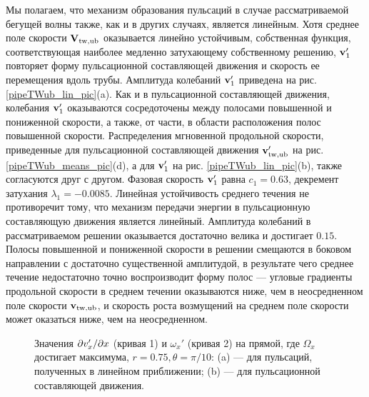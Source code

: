 Мы полагаем, что механизм образования пульсаций в случае рассматриваемой бегущей волны также, как и в других случаях, является линейным. Хотя среднее поле скорости $\mathbf{V}_\mathrm{tw,ub}$ оказывается линейно устойчивым, собственная функция, соответствующая наиболее медленно затухающему собственному решению, $\mathbf{v}'_1$ повторяет форму пульсационной составляющей движения и скорость ее перемещения вдоль трубы. Амплитуда колебаний $\mathbf{v}'_1$ приведена на рис. \ref{pipeTWub_lin_pic}(a). Как и в пульсационной составляющей движения, колебания $\mathbf{v}'_1$ оказываются сосредоточены между полосами повышенной и пониженной скорости, а также, от части, в области расположения полос повышенной скорости. Распределения мгновенной продольной скорости, приведенные для пульсационной составляющей движения $\mathbf{v}'_\mathrm{tw,ub}$ на рис. \ref{pipeTWub_means_pic}(d), а для $\mathbf{v}'_1$ на рис. \ref{pipeTWub_lin_pic}(b), также согласуются друг с другом. Фазовая скорость $\mathbf{v}'_1$ равна $c_1 = 0.63$, декремент затухания $\lambda_1 = -0.0085$. Линейная устойчивость среднего течения не противоречит тому, что механизм передачи энергии в пульсационную составляющую движения является линейный. Амплитуда колебаний в рассматриваемом решении оказывается достаточно велика и достигает $0.15$. Полосы повышенной и пониженной скорости в решении смещаются в боковом направлении с достаточно существенной амплитудой, в результате чего среднее течение недостаточно точно воспроизводит форму полос --- угловые градиенты продольной скорости в среднем течении оказываются ниже, чем в неосредненном поле скорости $\mathbf{v}_\mathrm{tw,ub}$, и скорость роста возмущений на среднем поле скорости может оказаться ниже, чем на неосредненном.

\begin{figure}
\caption{Значения $\partial v_x' /\partial x$ (кривая 1) и $\omega_x'$ (кривая 2) на прямой, где $\Omega_x$ достигает максимума, $r = 0.75, \theta = \pi/10$: (a) --- для пульсаций, полученных в линейном приближении; (b) --- для пульсационной составляющей движения. }
\label{pipeTWub_corr_pic}
\end{figure}

